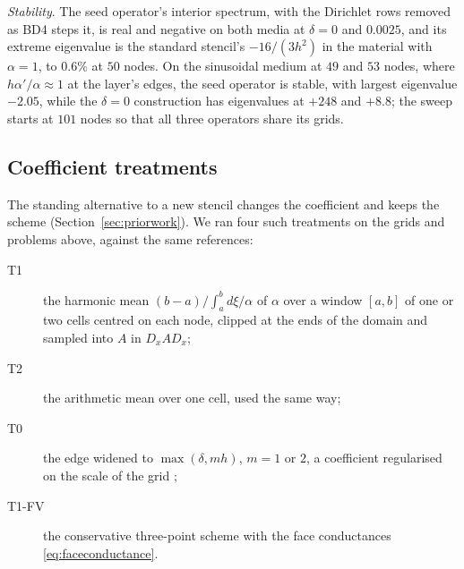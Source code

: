 \documentclass[11pt]{amsart}
\theoremstyle{definition}
\theoremstyle{remark}
\newcommand{\para}[1]{\par\smallskip\noindent\textit{#1}.\enspace}
\begin{document}
\para{Stability}
The seed operator's interior spectrum, with the Dirichlet rows removed as
BD4 steps it, is real and negative on both media at $\delta = 0$ and
$0.0025$, and its extreme eigenvalue is the standard stencil's
$-16/(3h^2)$ in the material with $\alpha = 1$, to $0.6\%$ at $50$ nodes.
On the sinusoidal medium at $49$ and $53$ nodes, where
$h\alpha'/\alpha \approx 1$ at the layer's edges, the seed operator is
stable, with largest eigenvalue $-2.05$, while the $\delta = 0$
construction has eigenvalues at $+248$ and $+8.8$; the sweep starts at
$101$ nodes so that all three operators share its grids.

\subsection{Coefficient treatments}
\label{sec:treatments1d}
The standing alternative to a new stencil changes the coefficient and
keeps the scheme (Section~\ref{sec:priorwork}). We ran four such treatments
on the grids and problems above, against the same references:
\begin{description}
\item[T1] the harmonic mean $(b - a) / \int_a^b d\xi / \alpha$ of $\alpha$
  over a window $[a, b]$ of one or two cells centred on each node, clipped
  at the ends of the domain and sampled into $A$ in $D_x A D_x$;
\item[T2] the arithmetic mean over one cell, used the same way;
\item[T0] the edge widened to $\max(\delta, m h)$, $m = 1$ or $2$, a
  coefficient regularised on the scale of the grid
  \cite{TornbergEngquist2003};
\item[T1-FV] the conservative three-point scheme with the face
  conductances \eqref{eq:faceconductance}.
\end{description}
\end{document}
